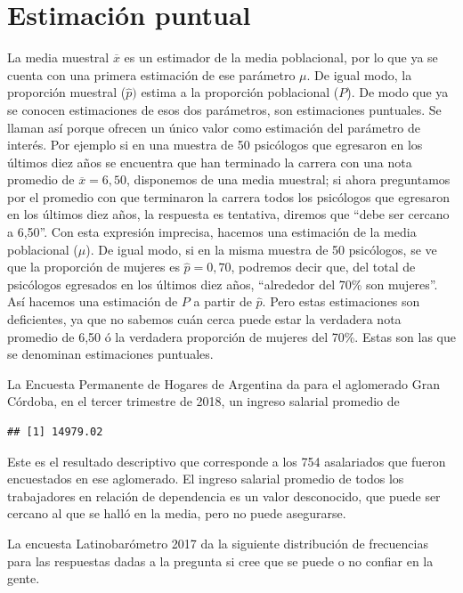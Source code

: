 \documentclass[]{book}
\begin{document}
\hypertarget{estimaciuxf3n-puntual}{%
\section{Estimación puntual}\label{estimaciuxf3n-puntual}}

La media muestral \(\overline{x}\) es un estimador de la media
poblacional, por lo que ya se cuenta con una primera estimación de ese
parámetro \(\mu\). De igual modo, la proporción muestral (\(\widehat{p})\)
estima a la proporción poblacional (\(P\)). De modo que ya se conocen
estimaciones de esos dos parámetros, son estimaciones puntuales. Se
llaman así porque ofrecen un único valor como estimación del parámetro
de interés. Por ejemplo si en una muestra de 50 psicólogos que egresaron
en los últimos diez años se encuentra que han terminado la carrera con
una nota promedio de \(\overline{x} = 6,50\), disponemos de una media
muestral; si ahora preguntamos por el promedio con que terminaron la
carrera todos los psicólogos que egresaron en los últimos diez años, la
respuesta es tentativa, diremos que ``debe ser cercano a 6,50''. Con esta
expresión imprecisa, hacemos una estimación de la media poblacional
(\(\mu\)). De igual modo, si en la misma muestra de 50 psicólogos, se ve
que la proporción de mujeres es \(\widehat{p} = 0,70\), podremos decir
que, del total de psicólogos egresados en los últimos diez años,
``alrededor del 70\% son mujeres''. Así hacemos una estimación de \(P\) a
partir de \(\widehat{p}\). Pero estas estimaciones son deficientes, ya que
no sabemos cuán cerca puede estar la verdadera nota promedio de 6,50 ó
la verdadera proporción de mujeres del 70\%. Estas son las que se
denominan estimaciones puntuales.

La Encuesta Permanente de Hogares de Argentina da para el aglomerado Gran Córdoba, en el tercer trimestre de 2018, un ingreso salarial promedio de

\begin{verbatim}
## [1] 14979.02
\end{verbatim}

Este es el resultado descriptivo que corresponde a los 754 asalariados que fueron encuestados en ese aglomerado. El ingreso salarial promedio de todos los trabajadores en relación de dependencia es un valor desconocido, que puede ser cercano al que se halló en la media, pero no puede asegurarse.

La encuesta Latinobarómetro 2017 da la siguiente distribución de frecuencias para las respuestas dadas a la pregunta si cree que se puede o no confiar en la gente.
\end{document}
